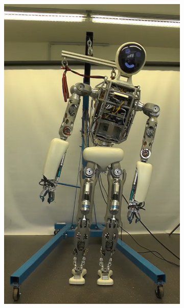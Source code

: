 \begin{figure}[h!]
\begin{subfigure}{.2\textwidth}
	\includegraphics[width=.95\linewidth]{experiments/balancing/4}
	\caption{}
\end{subfigure}%
\begin{subfigure}{.2\textwidth}

\end{subfigure}
\end{figure}
